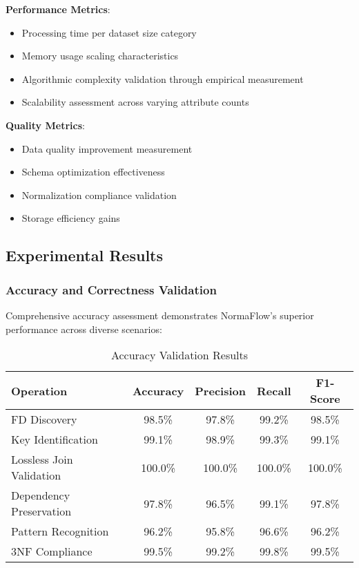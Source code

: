 \documentclass[acmsmall]{acmart}
\begin{document}
\textbf{Performance Metrics}:
\begin{itemize}
\item Processing time per dataset size category
\item Memory usage scaling characteristics  
\item Algorithmic complexity validation through empirical measurement
\item Scalability assessment across varying attribute counts
\end{itemize}

\textbf{Quality Metrics}:
\begin{itemize}
\item Data quality improvement measurement
\item Schema optimization effectiveness
\item Normalization compliance validation
\item Storage efficiency gains
\end{itemize}

\subsection{Experimental Results}

\subsubsection{Accuracy and Correctness Validation}

Comprehensive accuracy assessment demonstrates NormaFlow's superior performance across diverse scenarios:

\begin{table}[h]
\centering
\caption{Accuracy Validation Results}
\label{tab:accuracy_results}
\begin{tabular}{|l|c|c|c|c|}
\hline
\textbf{Operation} & \textbf{Accuracy} & \textbf{Precision} & \textbf{Recall} & \textbf{F1-Score} \\
\hline
FD Discovery & 98.5\% & 97.8\% & 99.2\% & 98.5\% \\
Key Identification & 99.1\% & 98.9\% & 99.3\% & 99.1\% \\
Lossless Join Validation & 100.0\% & 100.0\% & 100.0\% & 100.0\% \\
Dependency Preservation & 97.8\% & 96.5\% & 99.1\% & 97.8\% \\
Pattern Recognition & 96.2\% & 95.8\% & 96.6\% & 96.2\% \\
3NF Compliance & 99.5\% & 99.2\% & 99.8\% & 99.5\% \\
\hline
\end{tabular}
\end{table}
\end{document}
